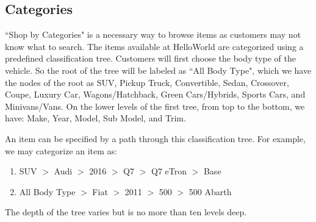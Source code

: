 \documentclass[12pt]{article}
\begin{document}
\subsection{Categories}
``Shop by Categories" is a necessary way to browse items as customers may not know what to search. The items available at HelloWorld are categorized using a predefined classification tree. Customers will first choose the body type of the vehicle. So the root of the tree will be labeled as ``All Body Type", which we have the nodes of the root as SUV, Pickup Truck, Convertible, Sedan, Crossover, Coupe, Luxury Car, Wagons/Hatchback, Green Cars/Hybrids, Sports Cars, and Minivans/Vans. On the lower levels of the first tree, from top to the bottom, we have: Make, Year, Model, Sub Model, and Trim. \par
An item can be specified by a path through this classification tree. For example, we may
categorize an item as:
\begin{enumerate}
\item SUV $>$ Audi $>$ 2016 $>$ Q7 $>$ Q7 eTron $>$ Base\par
\item All Body Type $>$ Fiat $>$ 2011 $>$ 500 $>$ 500 Abarth\par
\end{enumerate}
\par The depth of the tree varies but is no more than ten levels deep.
\end{document}

